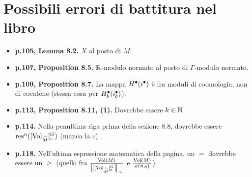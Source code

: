 \section*{Possibili errori di battitura nel libro} 
\begin{itemize}
\item \textbf{p.105, Lemma 8.2.} $X$ al posto di $M$.
\item \textbf{p.107, Proposition 8.5.} $\mathbb{R}$-modulo normato al posto di $\Gamma$-modulo normato.
\item \textbf{p.109, Proposition 8.7.} La mappa $H^\bullet(i^\bullet)$ è fra moduli di coomologia, non di cocatene (stessa cosa per $H^\bullet_b(i^\bullet_b)$).
\item \textbf{p.113, Proposition 8.11, (1).} Dovrebbe essere $k\in\mathbb{N}$.
\item \textbf{p.114.} Nella penultima riga prima della sezione 8.8, dovrebbe essere $\operatorname{res}^n([\operatorname{Vol}_{\widetilde M}]^G_c)$ (manca la $c$).
\item \textbf{p.118.} Nell'ultima espressione matematica della pagina, un $=$ dovrebbe essere un $\ge$ (quello fra $\frac{\operatorname{Vol}(M)}{\left\lVert [\operatorname{Vol}_{\widetilde M}]^G_c\right\rVert_\infty}$ e $\frac{\operatorname{Vol}(M)}{\kappa(n,\epsilon)}$).
\end{itemize}